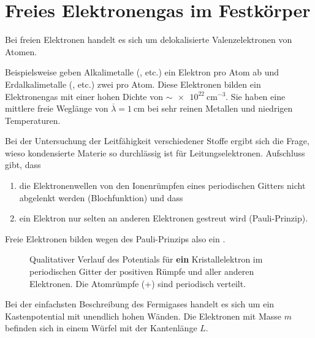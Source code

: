 \setcounter{section}{6}

\section{Freies Elektronengas im Festkörper}
	Bei freien Elektronen handelt es sich um delokalisierte Valenzelektronen von Atomen.

	Beispielsweise geben Alkalimetalle (,  etc.) ein Elektron pro Atom ab und Erdalkalimetalle (,  etc.) zwei pro Atom. 
	Diese Elektronen bilden ein Elektronengas mit einer hohen Dichte von $\sim \SI{e22}{\centi\meter^{-3}}$.
	Sie haben eine mittlere freie Weglänge von $\overline{\lambda} = \SI{1}{\centi \meter}$ bei sehr reinen Metallen und niedrigen Temperaturen.

	Bei der Untersuchung der Leitfähigkeit verschiedener Stoffe ergibt sich die Frage, wieso kondensierte Materie so durchlässig ist für Leitungselektronen. 
	Aufschluss gibt, dass
	\begin{enumerate}
		\item die Elektronenwellen von den Ionenrümpfen eines periodischen Gitters nicht abgelenkt werden (Blochfunktion) und dass
		\item ein Elektron nur selten an anderen Elektronen gestreut wird (Pauli-Prinzip).
	\end{enumerate}
	Freie Elektronen bilden wegen des Pauli-Prinzips also ein .

	\begin{figure}[H]
		\centering
		\label{fig:vl25_abbildung_1}
		\caption{Qualitativer Verlauf des Potentials für \textbf{ein} Kristallelektron im periodischen Gitter der positiven Rümpfe und aller anderen Elektronen. Die Atomrümpfe (+) sind periodisch verteilt.}
	\end{figure}

	Bei der einfachsten Beschreibung des Fermigases handelt es sich um ein Kastenpotential mit unendlich hohen Wänden. 
	Die Elektronen mit Masse $m$ befinden sich in einem Würfel mit der Kantenlänge $L$. 

